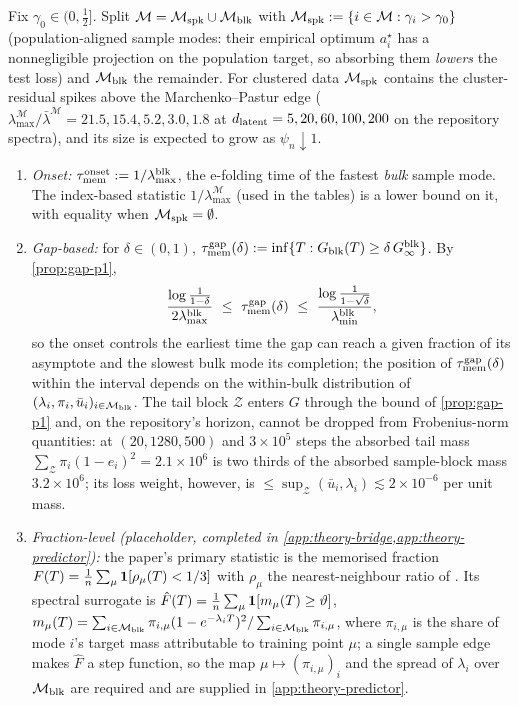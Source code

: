 \begin{definition}\label{def:taumem-p1}
Fix $\gamma_0\in(0,\tfrac12]$. Split $\mathcal M=\mathcal M_{\rm spk}\cup\mathcal M_{\rm blk}$ with $\mathcal M_{\rm spk}:=\{i\in\mathcal M:\gamma_i>\gamma_0\}$ (population-aligned sample modes: their empirical optimum $a_i^\star$ has a nonnegligible projection on the population target, so absorbing them \emph{lowers} the test loss) and $\mathcal M_{\rm blk}$ the remainder. For clustered data $\mathcal M_{\rm spk}$ contains the cluster-residual spikes above the Marchenko--Pastur edge ($\lambda^{\mathcal M}_{\max}/\bar\lambda^{\mathcal M}=21.5,15.4,5.2,3.0,1.8$ at $d_{\mathrm{latent}}=5,20,60,100,200$ on the repository spectra), and its size is expected to grow as $\psi_n\downarrow1$.
\begin{enumerate}
\item[(i)] \emph{Onset:} $\tau_{\mathrm{mem}}^{\rm onset}:=1/\lambda^{\rm blk}_{\max}$, the e-folding time of the fastest \emph{bulk} sample mode. The index-based statistic $1/\lambda^{\mathcal M}_{\max}$ (used in the tables) is a lower bound on it, with equality when $\mathcal M_{\rm spk}=\emptyset$.
\item[(ii)] \emph{Gap-based:} for $\delta\in(0,1)$, $\tau_{\mathrm{mem}}^{\rm gap}(\delta):=\inf\{T:G_{\rm blk}(T)\ge\delta\,G^{\rm blk}_\infty\}$. By \cref{prop:gap-p1},
\[
\frac{\log\frac1{1-\delta}}{2\lambda^{\rm blk}_{\max}}\ \le\ \taumem^{\rm gap}(\delta)\ \le\ \frac{\log\frac1{1-\sqrt\delta}}{\lambda^{\rm blk}_{\min}},
\]
so the onset controls the earliest time the gap can reach a given fraction of its asymptote and the slowest bulk mode its completion; the position of $\tau_{\mathrm{mem}}^{\rm gap}(\delta)$ within the interval depends on the within-bulk distribution of $(\lambda_i,\pi_i,\bar u_i)_{i\in\mathcal M_{\rm blk}}$. The tail block $\mathcal Z$ enters $G$ through the bound of \cref{prop:gap-p1} and, on the repository's horizon, cannot be dropped from Frobenius-norm quantities: at $(20,1280,500)$ and $3\times10^5$ steps the absorbed tail mass $\sum_{\mathcal Z}\pi_i(1-e_i)^2=2.1\times10^6$ is two thirds of the absorbed sample-block mass $3.2\times10^6$; its loss weight, however, is $\le\sup_{\mathcal Z}(\bar u_i,\lambda_i)\lesssim2\times10^{-6}$ per unit mass.
\item[(iii)] \emph{Fraction-level (placeholder, completed in \cref{app:theory-bridge,app:theory-predictor}):} the paper's primary statistic is the memorised fraction $F(T)=\tfrac1{n}\sum_\mu\mathbf 1[\rho_\mu(T)<1/3]$ with $\rho_\mu$ the nearest-neighbour ratio of \citet{somepalli2023diffusion}. Its spectral surrogate is $\hat F(T)=\tfrac1{n}\sum_\mu\mathbf 1[m_\mu(T)\ge\vartheta]$, $m_\mu(T)=\sum_{i\in\mathcal M_{\rm blk}}\pi_{i,\mu}(1-e^{-\lambda_iT})^2/\sum_{i\in\mathcal M_{\rm blk}}\pi_{i,\mu}$, where $\pi_{i,\mu}$ is the share of mode $i$'s target mass attributable to training point $\mu$; a single sample edge makes $\hat F$ a step function, so the map $\mu\mapsto(\pi_{i,\mu})_i$ and the spread of $\lambda_i$ over $\mathcal M_{\rm blk}$ are required and are supplied in \cref{app:theory-predictor}.

\end{enumerate}
\end{definition}
